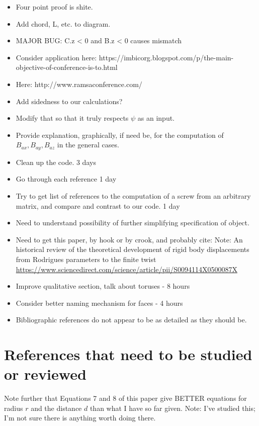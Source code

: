 \documentclass[11pt]{article}
\begin{document}
{\begin{itemize}
\item  Four point proof is shite.
  \item Add chord, L, etc. to diagram.
  \item MAJOR BUG: C.z < 0 and B.z < 0 causes mismatch
\item Consider application here: https://imbicorg.blogspot.com/p/the-main-objective-of-conference-is-to.html
  \item Here: http://www.ramsaconference.com/
\item Add sidedness to our calculations?
  \item Modify that so that it truly respects $\psi$ as an input.
\item Provide explanation, graphically, if need be, for
  the computation of $B_{ax}, B_{ay}, B_{az}$ in the general cases.
\item Clean up the code. 3 days
\item Go through each reference 1 day
\item Try to get list of references to the computation of a screw from an arbitrary matrix, and compare and contrast to our code. 1 day
\item Need to understand possibility of further simplifying specification of object.

\item Need to get this paper, by hook or by crook, and probably cite:
  Note: An historical review of the theoretical development of rigid body displacements from Rodrigues parameters to the finite twist
  \url{https://www.sciencedirect.com/science/article/pii/S0094114X0500087X}
  \item Improve qualitative section, talk about toruses - 8 hours
  \item Consider better naming mechanism for faces - 4 hours
    \item Bibliographic references do not appear to be as detailed as they should be.
  \end{itemize}

\section{References that need to be studied or reviewed}


Note further that Equations 7 and 8 of this paper\cite{kahn1989defining} give BETTER equations for radius $r$ and the distance $d$ than what I have so far given. Note: I've studied this; I'm not sure there is anything worth doing there.

}
\end{document}
